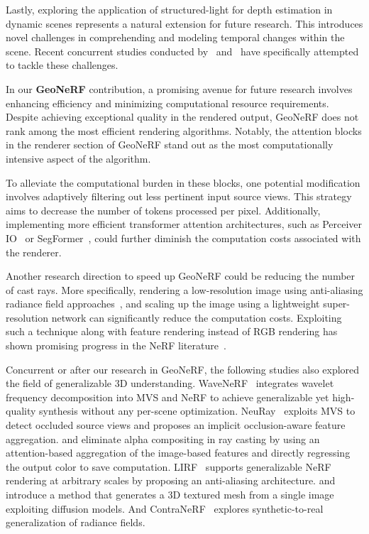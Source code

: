 Lastly, exploring the application of structured-light for depth estimation in dynamic scenes represents a natural extension for future research. This introduces novel challenges in comprehending and modeling temporal changes within the scene. Recent concurrent studies conducted by~\cite{qiao2022tide} and~\cite{qiao2023online} have specifically attempted to tackle these challenges.

In our \textbf{GeoNeRF} contribution, a promising avenue for future research involves enhancing efficiency and minimizing computational resource requirements. Despite achieving exceptional quality in the rendered output, GeoNeRF does not rank among the most efficient rendering algorithms. Notably, the attention blocks in the renderer section of GeoNeRF stand out as the most computationally intensive aspect of the algorithm.

To alleviate the computational burden in these blocks, one potential modification involves adaptively filtering out less pertinent input source views. This strategy aims to decrease the number of tokens processed per pixel. Additionally, implementing more efficient transformer attention architectures, such as Perceiver IO~\citep{jaegle2021perceiver} or SegFormer~\citep{xie2021segformer}, could further diminish the computation costs associated with the renderer.

Another research direction to speed up GeoNeRF could be reducing the number of cast rays. More specifically, rendering a low-resolution image using anti-aliasing radiance field approaches~\citep{Barron_2021_ICCV, hu2023tri}, and scaling up the image using a lightweight super-resolution network can significantly reduce the computation costs. Exploiting such a technique along with feature rendering instead of RGB rendering has shown promising progress in the NeRF literature~\citep{huang2023refsr,wang20224k,han2024volume}.

Concurrent or after our research in GeoNeRF, the following studies also explored the field of generalizable 3D understanding. WaveNeRF~\citep{xu2023wavenerf} integrates wavelet frequency decomposition into MVS and NeRF to achieve generalizable yet high-quality synthesis without any per-scene optimization. NeuRay~\citep{liu2022neural} exploits MVS to detect occluded source views and proposes an implicit occlusion-aware feature aggregation. \cite{du2023learning} and \cite{suhail2022generalizable} eliminate alpha compositing in ray casting by using an attention-based aggregation of the image-based features and directly regressing the output color to save computation. LIRF~\citep{huang2023local} supports generalizable NeRF rendering at arbitrary scales by proposing an anti-aliasing architecture. \cite{liu2024one} and \citep{liu2023onetwo} introduce a method that generates a 3D textured mesh from a single image exploiting diffusion models. And ContraNeRF~\citep{yang2023contranerf} explores synthetic-to-real generalization of radiance fields.


